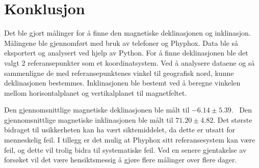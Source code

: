 \section{Konklusjon}


Det ble gjort målinger for å finne den magnetiske deklinasjonen og inklinasjon. Målingene ble gjennomført med bruk av telefoner og Phyphox. Data ble så eksportert og analysert ved hjelp av Python. For å finne deklinasjonen ble det valgt 2 referansepunkter som et koordinatsystem. Ved å analysere dataene og så sammenligne de med referansepunktenes vinkel til geografisk nord, kunne deklinasjonen bestemmes. Inklinasjonen ble bestemt ved å beregne vinkelen mellom horisontalplanet og vertikalplanet til magnetfeltet. 

Den gjennomsnittlige magnetiske deklinasjonen ble målt til $-6.14 \pm 5.39$\textdegree. \ Den gjennomsnittlige magnetiske inklinasjonen ble målt til $71.20 \pm 4.82$\textdegree. Det største bidraget til usikkerheten kan ha vært siktemiddelet, da dette er utsatt for menneskelig feil. I tillegg er det mulig at Phyphox sitt referansesystem kan være feil, og dette vil trolig bidra til systematiske feil. Ved en senere gjentakelse av forsøket vil det være hensiktsmessig å gjøre flere målinger over flere dager.     

